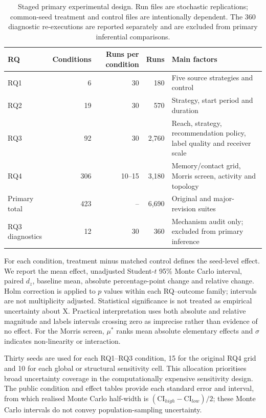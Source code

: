 \begin{table}[ht]
\centering
\caption{Staged primary experimental design. Run files are stochastic replications; common-seed treatment and control files are intentionally dependent. The 360 diagnostic re-executions are reported separately and are excluded from primary inferential comparisons.}
\label{tab:design}
\small
\begin{tabular}{lrrrp{5.2cm}}
\toprule RQ & Conditions & Runs per condition & Runs & Main factors \\
\midrule
RQ1 & 6 & 30 & 180 & Five source strategies and control \\
RQ2 & 19 & 30 & 570 & Strategy, start period and duration \\
RQ3 & 92 & 30 & 2,760 & Reach, strategy, recommendation policy, label quality and receiver scale \\
RQ4 & 306 & 10--15 & 3,180 & Memory/contact grid, Morris screen, activity and topology \\
\midrule Primary total & 423 & -- & 6,690 & Original and major-revision suites \\
RQ3 diagnostics & 12 & 30 & 360 & Mechanism audit only; excluded from primary inference \\
\bottomrule
\end{tabular}
\end{table}

For each condition, treatment minus matched control defines the seed-level effect. We report the mean effect, unadjusted Student-$t$ 95\% Monte Carlo interval, paired $d_z$, baseline mean, absolute percentage-point change and relative change. Holm correction is applied to $p$ values within each RQ--outcome family; intervals are not multiplicity adjusted. Statistical significance is not treated as empirical uncertainty about X. Practical interpretation uses both absolute and relative magnitude and labels intervals crossing zero as imprecise rather than evidence of no effect. For the Morris screen, $\mu^*$ ranks mean absolute elementary effects and $\sigma$ indicates non-linearity or interaction.

Thirty seeds are used for each RQ1--RQ3 condition, 15 for the original RQ4 grid and 10 for each global or structural sensitivity cell. This allocation prioritises broad uncertainty coverage in the computationally expensive sensitivity design. The public condition and effect tables provide each standard error and interval, from which realised Monte Carlo half-width is $(\mathrm{CI}_{high}-\mathrm{CI}_{low})/2$; these Monte Carlo intervals do not convey population-sampling uncertainty.

